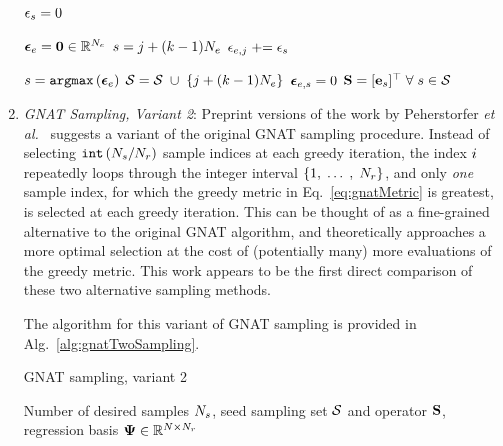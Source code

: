 \begin{enumerate}
\begin{algorithm}
\begin{algorithmic}
				\FORALL{$\sampIdx \in \sampSet$}
					\STATE $\epsilon_{s} = 0$ 
				\ENDFOR
	
				\STATE $\boldsymbol{\epsilon}_{e} = \mathbf{0} \in \mathbb{R}^{N_{e}}$
						\STATE $s = j + (k - 1) N_{e}$
						\STATE $\epsilon_{e,j} \mathrel{+}= \epsilon_{s}$ 
					\ENDFOR
				\ENDFOR
				
					\STATE $s = \mathtt{argmax} \left( \boldsymbol{\epsilon}_{e} \right)$
						\STATE $\mathcal{S} = \mathcal{S} \; \cup \; \{j + (k - 1) N_{e}\} $ 
					\ENDFOR
					\STATE $\boldsymbol{\epsilon}_{e,s} = 0$
					\STATE $\mathbf{S} = [\mathbf{e}_{s}]^\top \; \forall \; s \in \mathcal{S}$
				\ENDFOR
				
			\ENDFOR
		\end{algorithmic}
	\end{algorithm}

	\item \textit{GNAT Sampling, Variant 2}: Preprint versions of the work by Peherstorfer \textit{et al.}~\cite{Peherstorfer2020} suggests a variant of the original GNAT sampling procedure. Instead of selecting $\text{\texttt{int}}\left(N_s / N_r\right)$ sample indices at each greedy iteration, the index $i$ repeatedly loops through the integer interval $\{1, \; \hdots \;, \; N_r\}$, and only \textit{one} sample index, for which the greedy metric in Eq.~\ref{eq:gnatMetric} is greatest, is selected at each greedy iteration. This can be thought of as a fine-grained alternative to the original GNAT algorithm, and theoretically approaches a more optimal selection at the cost of (potentially many) more evaluations of the greedy metric. This work appears to be the first direct comparison of these two alternative sampling methods.
	
	The algorithm for this variant of GNAT sampling is provided in Alg.~\ref{alg:gnatTwoSampling}.

	\begin{algorithm}
		\caption{GNAT sampling, variant 2}\label{alg:gnatTwoSampling}
		\begin{algorithmic}
			\REQUIRE Number of desired samples $N_s$, seed sampling set $\mathcal{S}$ and operator $\mathbf{S}$, regression basis $\deimBasis \inRTwo{\numDOF}{\numResModes}$ 
	

\end{algorithmic}
\end{algorithm}
\end{enumerate}

